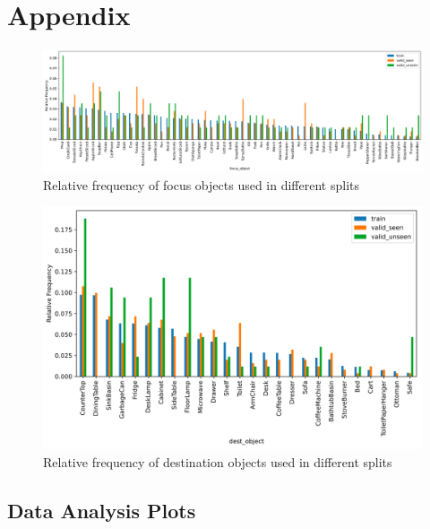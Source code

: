 \documentclass[11pt,a4paper]{article}
\begin{document}
\clearpage
\section{Appendix}

\begin{figure}
    \centering
    \includegraphics[scale=0.3]{figures/focus_obj_freqs.png}
    \caption{Relative frequency of focus objects used in different splits}
    \label{fig:focus}
\end{figure}

\begin{figure}
    \centering
    \includegraphics[scale=0.5]{figures/dest_obj_freqs.png}
    \caption{Relative frequency of destination objects used in different splits}
    \label{fig:dest}
\end{figure}


\subsection{Data Analysis Plots}
\end{document}
